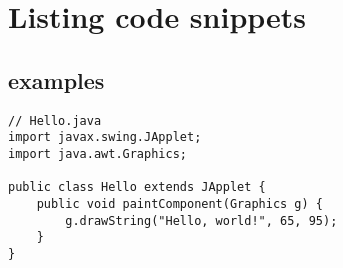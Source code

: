 \documentclass[11pt,fleqn,oneside,openany]{book} %
\begin{document}

\chapter{Listing code snippets}

\section{examples}

\begin{mdframed}[style=code_box]
\end{mdframed}

\lstset{language=Java} %

\begin{mdframed}[style=code_box]
\begin{lstlisting}[caption={Java snippet},captionpos=b]
// Hello.java
import javax.swing.JApplet;
import java.awt.Graphics;

public class Hello extends JApplet {
    public void paintComponent(Graphics g) {
        g.drawString("Hello, world!", 65, 95);
    }    
}
\end{lstlisting}
\end{mdframed}






\end{document}
